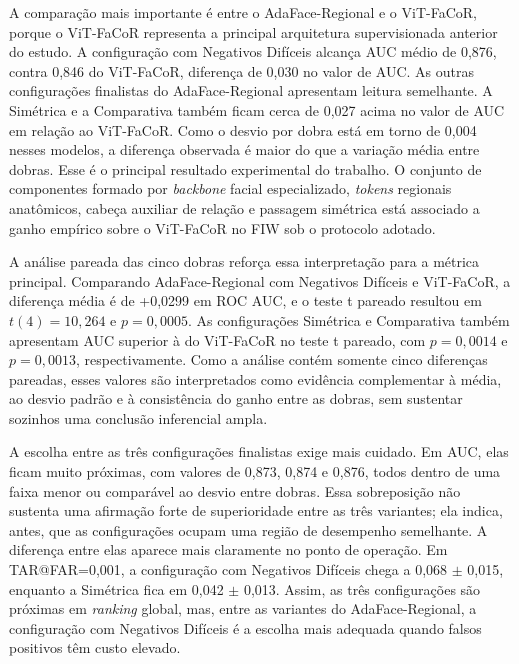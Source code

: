 A comparação mais importante é entre o AdaFace-Regional e o ViT-FaCoR, porque o ViT-FaCoR representa a principal arquitetura supervisionada anterior do estudo. A configuração com Negativos Difíceis alcança AUC médio de 0,876, contra 0,846 do ViT-FaCoR, diferença de 0,030 no valor de AUC. As outras configurações finalistas do AdaFace-Regional apresentam leitura semelhante. A Simétrica e a Comparativa também ficam cerca de 0,027 acima no valor de AUC em relação ao ViT-FaCoR. Como o desvio por dobra está em torno de 0,004 nesses modelos, a diferença observada é maior do que a variação média entre dobras. Esse é o principal resultado experimental do trabalho. O conjunto de componentes formado por \textit{backbone} facial especializado, \textit{tokens} regionais anatômicos, cabeça auxiliar de relação e passagem simétrica está associado a ganho empírico sobre o ViT-FaCoR no FIW sob o protocolo adotado.

A análise pareada das cinco dobras reforça essa interpretação para a métrica principal. Comparando AdaFace-Regional com Negativos Difíceis e ViT-FaCoR, a diferença média é de +0,0299 em ROC AUC, e o teste t pareado resultou em $t(4)=10{,}264$ e $p=0{,}0005$. As configurações Simétrica e Comparativa também apresentam AUC superior à do ViT-FaCoR no teste t pareado, com $p=0{,}0014$ e $p=0{,}0013$, respectivamente. Como a análise contém somente cinco diferenças pareadas, esses valores são interpretados como evidência complementar à média, ao desvio padrão e à consistência do ganho entre as dobras, sem sustentar sozinhos uma conclusão inferencial ampla.

A escolha entre as três configurações finalistas exige mais cuidado. Em AUC, elas ficam muito próximas, com valores de 0,873, 0,874 e 0,876, todos dentro de uma faixa menor ou comparável ao desvio entre dobras. Essa sobreposição não sustenta uma afirmação forte de superioridade entre as três variantes; ela indica, antes, que as configurações ocupam uma região de desempenho semelhante. A diferença entre elas aparece mais claramente no ponto de operação. Em TAR@FAR=0{,}001, a configuração com Negativos Difíceis chega a 0,068 $\pm$ 0,015, enquanto a Simétrica fica em 0,042 $\pm$ 0,013. Assim, as três configurações são próximas em \textit{ranking} global, mas, entre as variantes do AdaFace-Regional, a configuração com Negativos Difíceis é a escolha mais adequada quando falsos positivos têm custo elevado.

